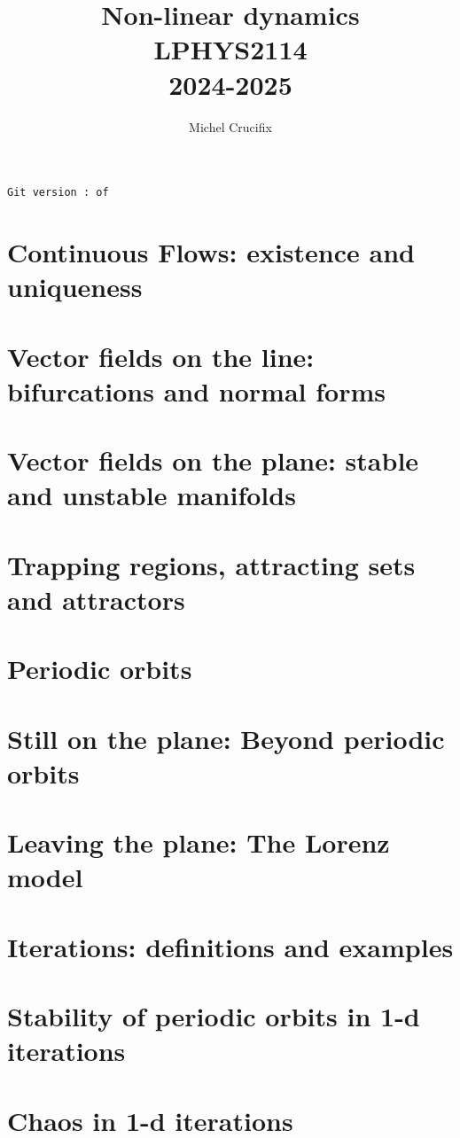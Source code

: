 \documentclass[fleqn,twoside]{mc}
\title{Non-linear dynamics \\ LPHYS2114 \\ 2024-2025}
\author{Michel Crucifix}
\begin{document}
\titlepage
\tableofcontents
\texttt{Git version \gitbranch:\gitrevision \ of \gitdate}

\section{Continuous Flows: existence and uniqueness}


\section{Vector fields on the line: bifurcations and normal forms}


\section{Vector fields on the plane: stable and unstable manifolds}

\section{Trapping regions,  attracting sets and attractors}


\section{Periodic orbits}



 \section{Still on the plane: Beyond periodic orbits }


 
 \section{Leaving the plane: The Lorenz model }
 



\section{Iterations: definitions and examples}


\section{Stability of periodic orbits in 1-d iterations}


\section{Chaos in 1-d iterations}

\end{document}

